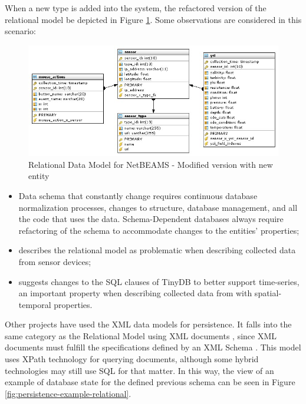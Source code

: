 When a new type is added into the system, the refactored version of the
relational model be depicted in Figure
\ref{fig:Relational-Model-Addition-Modified}. Some observations are considered
in this scenario:

\begin{figure}[!b]
  \centering
  \includegraphics[scale=0.6]{../diagrams/Relational-Model-Addition-Modified}
  \caption{Relational Data Model for NetBEAMS - Modified version with new
  entity}
  \label{fig:Relational-Model-Addition-Modified}
\end{figure}

\begin{itemize}
  \item Data schema that constantly change requires continuous database
  normalization processes, changes to structure, database management, and all
  the code that uses the data. Schema-Dependent databases always require
  refactoring of the schema to accommodate changes to the entities' properties;
  \item \cite{sn-provenance} describes the relational model as problematic 
  when describing collected data from sensor devices;
  \item \cite{sn-db-newop} suggests changes to the SQL clauses of TinyDB to
  better support time-series, an important property when describing
  collected data from with spatial-temporal properties.
\end{itemize}

Other projects have used the XML data models for persistence. It falls
into the same category as the Relational Model using XML documents \cite{xml},
since XML documents must fulfill the specifications defined by an XML Schema
\cite{xml-schema}. This model uses XPath \cite{xml-xpath} technology for
querying documents, although some hybrid \cite{db2} technologies may still use
SQL \cite{sql} for that matter. In this way, the view of an example of database
state for the defined previous schema can be seen in Figure
\ref{fig:persistence-example-relational}.

